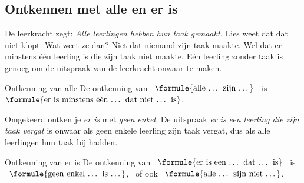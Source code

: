 \begin{oefeningen}
\end{oefeningen}

\subsection{Ontkennen met alle en er is}

De leerkracht zegt: \textit{Alle leerlingen hebben hun taak gemaakt.} Lies weet dat dat niet klopt. Wat weet ze dan? Niet dat niemand zijn taak maakte. Wel dat er minstens één leerling is die zijn taak niet maakte. Eén leerling zonder taak is genoeg om de uitspraak van de leerkracht onwaar te maken.

\begin{theorie}
\begin{stelling}{Ontkenning van alle}
De ontkenning van \ $\formule{\text{alle \ldots{} zijn \ldots}}$ \ is \ $\formule{\text{er is minstens één \ldots{} dat niet \ldots{} is}}$.
\end{stelling}
\end{theorie}


Omgekeerd ontken je \textit{er is} met \textit{geen enkel}. De uitspraak \textit{er is een leerling die zijn taak vergat} is onwaar als geen enkele leerling zijn taak vergat, dus als alle leerlingen hun taak bij hadden.

\begin{theorie}
\begin{stelling}{Ontkenning van er is}
De ontkenning van \ $\formule{\text{er is een \ldots{} dat \ldots{} is}}$ \ is \ $\formule{\text{geen enkel \ldots{} is \ldots}}$, \ of ook \ $\formule{\text{alle \ldots{} zijn niet \ldots}}$.
\end{stelling}
\end{theorie}

